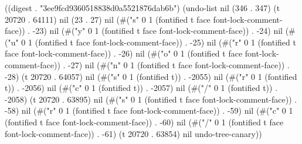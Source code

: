 
((digest . "3ee9fcd9360518838d0a5521876dab6b") (undo-list nil (346 . 347) (t 20720 . 64111) nil (23 . 27) nil (#("s" 0 1 (fontified t face font-lock-comment-face)) . -23) nil (#("y" 0 1 (fontified t face font-lock-comment-face)) . -24) nil (#("u" 0 1 (fontified t face font-lock-comment-face)) . -25) nil (#("r" 0 1 (fontified t face font-lock-comment-face)) . -26) nil (#("o" 0 1 (fontified t face font-lock-comment-face)) . -27) nil (#("n" 0 1 (fontified t face font-lock-comment-face)) . -28) (t 20720 . 64057) nil (#("s" 0 1 (fontified t)) . -2055) nil (#("r" 0 1 (fontified t)) . -2056) nil (#("c" 0 1 (fontified t)) . -2057) nil (#("/" 0 1 (fontified t)) . -2058) (t 20720 . 63895) nil (#("s" 0 1 (fontified t face font-lock-comment-face)) . -58) nil (#("r" 0 1 (fontified t face font-lock-comment-face)) . -59) nil (#("c" 0 1 (fontified t face font-lock-comment-face)) . -60) nil (#("/" 0 1 (fontified t face font-lock-comment-face)) . -61) (t 20720 . 63854) nil undo-tree-canary))
